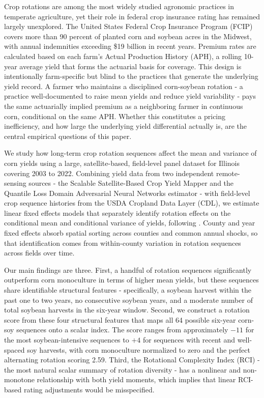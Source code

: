 \documentclass[12pt,letterpaper]{article}
\theoremstyle{remark}
\theoremstyle{plain}
\theoremstyle{definition}
\begin{document}
Crop rotations are among the most widely studied agronomic practices in temperate agriculture, yet their role in federal crop insurance rating has remained largely unexplored. The United States Federal Crop Insurance Program (FCIP) covers more than 90 percent of planted corn and soybean acres in the Midwest, with annual indemnities exceeding \$19 billion in recent years. Premium rates are calculated based on each farm's Actual Production History (APH), a rolling 10-year average yield that forms the actuarial basis for coverage. This design is intentionally farm-specific but blind to the practices that generate the underlying yield record. A farmer who maintains a disciplined corn-soybean rotation - a practice well-documented to raise mean yields and reduce yield variability - pays the same actuarially implied premium as a neighboring farmer in continuous corn, conditional on the same APH. Whether this constitutes a pricing inefficiency, and how large the underlying yield differential actually is, are the central empirical questions of this paper.
 
We study how long-term crop rotation sequences affect the mean and variance of corn yields using a large, satellite-based, field-level panel dataset for Illinois covering 2003 to 2022. Combining yield data from two independent remote-sensing sources - the Scalable Satellite-Based Crop Yield Mapper \citep[SCYM;][]{lobell2015} and the Quantile Loss Domain Adversarial Neural Networks estimator \citep[QDANN;][]{ma2024} - with field-level crop sequence histories from the USDA Cropland Data Layer (CDL), we estimate linear fixed effects models that separately identify rotation effects on the conditional mean and conditional variance of yields, following \citet{Just1979}. County and year fixed effects absorb spatial sorting across counties and common annual shocks, so that identification comes from within-county variation in rotation sequences across fields over time.
 
Our main findings are three. First, a handful of rotation sequences significantly outperform corn monoculture in terms of higher mean yields, but these sequences share identifiable structural features - specifically, a soybean harvest within the past one to two years, no consecutive soybean years, and a moderate number of total soybean harvests in the six-year window. Second, we construct a rotation score from these four structural features that maps all 64 possible six-year corn-soy sequences onto a scalar index. The score ranges from approximately $-11$ for the most soybean-intensive sequences to $+4$ for sequences with recent and well-spaced soy harvests, with corn monoculture normalized to zero and the perfect alternating rotation scoring 2.59. Third, the Rotational Complexity Index (RCI) - the most natural scalar summary of rotation diversity - has a nonlinear and non-monotone relationship with both yield moments, which implies that linear RCI-based rating adjustments would be misspecified.
 
\end{document}
